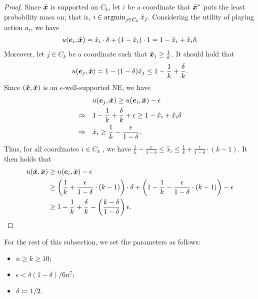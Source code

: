 \begin{proof}
    Since $\hat{{\bm{x}}}$ is supported on $C_k$, let $i$ be a coordinate that $\hat{{\bm{x}}}^*$ puts the least probability mass on; that is, $i \in \operatorname*{argmin}_{j \in C_k} \hat{x}_j.$ Considering the utility of playing action $a_i$, we have
    \begin{align*}
        u({\bm{e}}_i, \hat{{\bm{x}}}) = \hat{x}_i \cdot \delta + (1 - \hat{x}_i) \cdot 1 = 1 - \hat{x}_i + \hat{x}_i \delta.
    \end{align*}
    Moreover, let $j \in C_k$ be a coordinate such that $\hat{{\bm{x}}}_j \geq \frac{1}{k}$. It should hold that 
    \begin{align*}
    u({\bm{e}}_j, \hat{{\bm{x}}}) = 1 - (1-\delta)\hat{x}_j \leq 1 - \frac{1}{k} + \frac{\delta}{k}.
    \end{align*}
    Since $(\hat{{\bm{x}}}, \hat{{\bm{x}}})$ is an $\epsilon$-well-supported NE, we have
    \begin{align*}
    & u({\bm{e}}_j, \hat{{\bm{x}}}) \geq u({\bm{e}}_i, \hat{{\bm{x}}}) - \epsilon \\
    \Rightarrow  \quad  &1 - \frac{1}{k} + \frac{\delta}{k} + \epsilon \geq 1 - \hat{x}_i + \hat{x}_i \delta \\
        \Rightarrow \quad &\hat{x}_i \geq \frac{1}{k} - \frac{\epsilon}{1 - \delta}.
    \end{align*}
    Thus, for all coordinates $i\in C_k$ , we have $\frac{1}{k} -\frac{\epsilon}{1 - \delta}\leq \hat{x}_i \leq \frac{1}{k} + \frac{\epsilon}{1 - \delta} \cdot (k - 1).$
    It then holds that
    \begin{align*}
        u(\hat{{\bm{x}}}, \hat{{\bm{x}}}) & \geq u({\bm{e}}_i, \hat{{\bm{x}}}) - \epsilon \\
        & \geq \left(\frac{1}{k} + \frac{\epsilon}{1 - \delta} \cdot (k - 1)\right) \cdot \delta + \left(1 - \frac{1}{k} - \frac{\epsilon}{1 - \delta} \cdot (k - 1)\right) - \epsilon \\
        & \geq 1 - \frac{1}{k} + \frac{\delta}{k} - \left(\frac{k - \delta}{1 - \delta}\right) \epsilon.
    \end{align*}
\end{proof}

\begin{assumption} \label{assump:parameter}
    For the rest of this subsection, we set the parameters as follows:
    \begin{itemize}
        \item $n \geq k \geq 10;$
        \item $\epsilon < \delta(1 - \delta)/6n^7;$
        \item $\delta \coloneqq 1/2.$
    \end{itemize}
\end{assumption}

